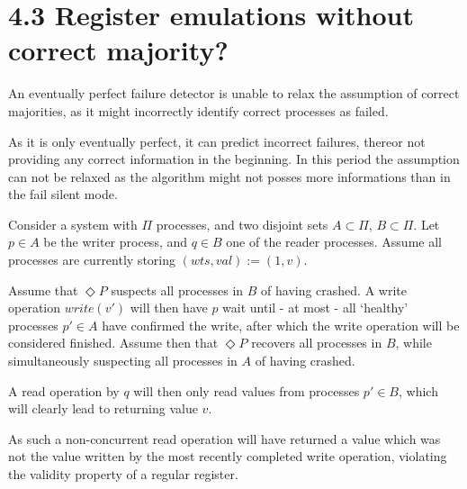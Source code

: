 \documentclass{article}
\begin{document}
    \section*{4.3 Register emulations without correct majority?}

    An eventually perfect failure detector is unable to relax the assumption of
    correct majorities, as it might incorrectly identify correct processes as
    failed.

    As it is only eventually perfect, it can predict incorrect failures, thereor not providing any correct information in the beginning.
    In this period the assumption can not be relaxed as the algorithm might not posses more informations than in the fail silent mode.

    Consider a system with $\Pi$ processes, and two disjoint sets $A \subset \Pi$,
    $B \subset \Pi$. Let $p \in A$ be the writer process, and $q \in B$ one of the
    reader processes. Assume all processes are currently storing $(wts, val) := (1,
    v)$.

    Assume that $\Diamond P$ suspects all processes in $B$ of having crashed. A
    write operation $write(v')$ will then have $p$ wait until - at most - all
    `healthy' processes $p' \in A$ have confirmed the write, after which the write
    operation will be considered finished. Assume then that $\Diamond P$ recovers
    all processes in $B$, while simultaneously suspecting all processes in $A$ of
    having crashed.

    A read operation by $q$ will then only read values from processes $p' \in B$,
    which will clearly lead to returning value $v$.

    As such a non-concurrent read operation will have returned a value which was
    not the value written by the most recently completed write operation, violating
    the validity property of a regular register.
\end{document}
